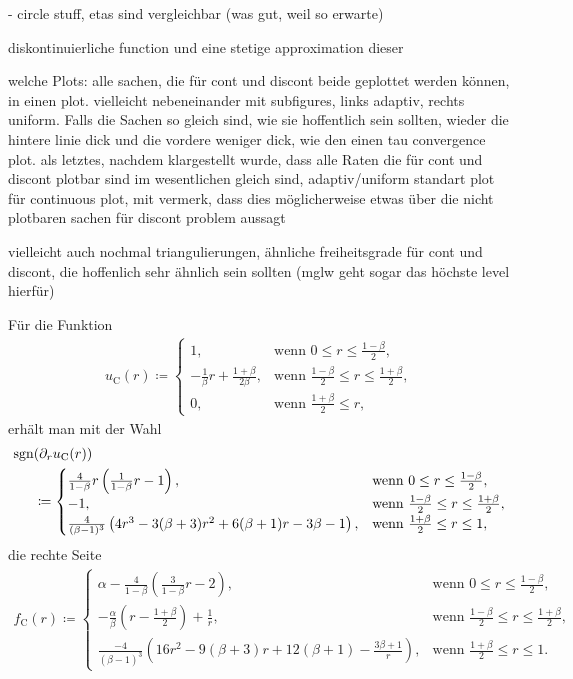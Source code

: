   - circle stuff, etas sind vergleichbar (was gut, weil so erwarte)

diskontinuierliche function und eine stetige approximation dieser

welche Plots: 
alle sachen, die für cont und discont beide geplottet werden können, in einen
plot. vielleicht nebeneinander mit subfigures, links adaptiv, rechts uniform.
Falls die Sachen so gleich sind, wie sie hoffentlich sein sollten, wieder
die hintere linie dick und die vordere weniger dick, wie den einen tau
convergence plot. 
als letztes, nachdem klargestellt wurde, dass alle Raten die für cont und
discont plotbar sind im wesentlichen gleich sind, adaptiv/uniform standart plot
für continuous plot, mit vermerk, dass dies möglicherweise etwas über die nicht
plotbaren sachen für discont problem aussagt

vielleicht auch nochmal triangulierungen, ähnliche freiheitsgrade für cont 
und discont, die hoffenlich sehr ähnlich sein sollten (mglw geht sogar das 
höchste level hierfür)

Für die Funktion
\begin{align*}
  u_\textrm{C}(r)\coloneqq 
  \begin{cases}
    1, & \text{wenn } 0\leq r\leq\frac{1-\beta}{2},\\
    -\frac{1}{\beta}r + \frac{1+\beta}{2\beta}, & 
    \text{wenn } \frac{1-\beta}{2}\leq r\leq \frac{1+\beta}{2},\\
    0, & \text{wenn } \frac{1+\beta}{2}\leq r,
  \end{cases}
\end{align*}
erhält man mit der Wahl
\begin{align*}
  \operatorname{sgn}&(\partial_r u_\textrm{C}(r)) \\
  &\coloneqq 
  \begin{cases}
    \frac{4}{1-\beta}r\left(\frac{1}{1-\beta}r -1\right), &
    \text{wenn } 0\leq r\leq\frac{1-\beta}{2},\\
    -1, & \text{wenn } \frac{1-\beta}{2}\leq r\leq \frac{1+\beta}{2},\\
    \frac{4}{(\beta-1)^3}
    \left( 4r^3-3(\beta+3)r^2 +6(\beta+1)r-3\beta-1\right), & 
    \text{wenn } \frac{1+\beta}{2}\leq r\leq 1,
  \end{cases}
\end{align*}
die rechte Seite
\begin{align*}
  f_\textrm{C}(r)\coloneqq 
  \begin{cases}
    \alpha - \frac{4}{1-\beta}\left(\frac{3}{1-\beta}r - 2\right), &
    \text{wenn } 0\leq r\leq\frac{1-\beta}{2},\\
    -\frac{\alpha}{\beta}\left( r-\frac{1+\beta}{2} \right) +\frac{1}{r}, & 
    \text{wenn } \frac{1-\beta}{2}\leq r\leq \frac{1+\beta}{2},\\
    \frac{-4}{(\beta-1)^3}
    \left( 16r^2 -9(\beta+3)r + 12(\beta+1) - \frac{3\beta+1}{r}\right), & 
    \text{wenn } \frac{1+\beta}{2}\leq r\leq 1.
  \end{cases}
\end{align*}

